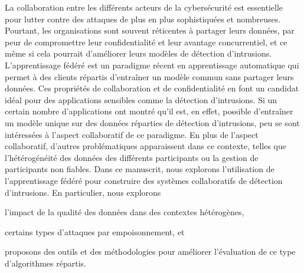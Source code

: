 La collaboration entre les différents acteurs de la cybersécurité est essentielle pour lutter contre des attaques de plus en plus sophistiquées et nombreuses.
Pourtant, les organisations sont souvent réticentes à partager leurs données, par peur de compromettre leur confidentialité et leur avantage concurrentiel, et ce même si cela pourrait d'améliorer leurs modèles de détection d'intrusions.
L'apprentissage fédéré est un paradigme récent en apprentissage automatique qui permet à des clients répartis d'entraîner un modèle commun sans partager leurs données.
Ces propriétés de collaboration et de confidentialité en font un candidat idéal pour des applications sensibles comme la détection d'intrusions.
Si un certain nombre d'applications ont montré qu'il est, en effet, possible d'entraîner un modèle unique sur des données réparties de détection d'intrusions, peu se sont intéressées à l'aspect collaboratif de ce paradigme.
En plus de l'aspect collaboratif, d'autres problématiques apparaissent dans ce contexte, telles que l'hétérogénéité des données des différents participants ou la gestion de participants non fiables.
%
Dans ce manuscrit, nous explorons l'utilisation de l'apprentissage fédéré pour construire des systèmes collaboratifs de détection d'intrusions.
En particulier, nous explorons
\begin{enumerate*}[label={\small(\roman*)}]
  \item l'impact de la qualité des données dans des contextes hétérogènes,
  \item certains types d'attaques par empoisonnement, et
  \item proposons des outils et des méthodologies pour améliorer l'évaluation de ce type d'algorithmes répartis.
\end{enumerate*}